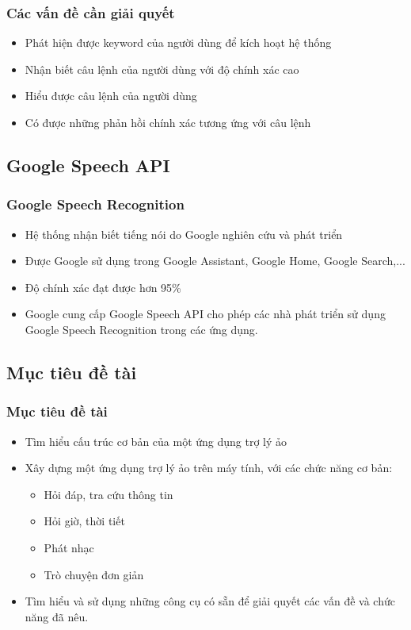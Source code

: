 \documentclass{beamer}
\begin{document}
\begin{frame}
\frametitle{Các vấn đề cần giải quyết}
\begin{itemize}
\item Phát hiện được keyword của người dùng để kích hoạt hệ thống
\item Nhận biết câu lệnh của người dùng với độ chính xác cao
\item Hiểu được câu lệnh của người dùng
\item Có được những phản hồi chính xác tương ứng với câu lệnh
\end{itemize}
\end{frame}

\subsection{Google Speech API}
\begin{frame}
\frametitle{Google Speech Recognition}
\begin{itemize}
\item Hệ thống nhận biết tiếng nói do Google nghiên cứu và phát triển
\item Được Google sử dụng trong Google Assistant, Google Home, Google Search,...
\item Độ chính xác đạt được hơn 95\%
\item Google cung cấp Google Speech API cho phép các nhà phát triển sử dụng Google Speech Recognition trong các ứng dụng.
\end{itemize}
\end{frame}

\subsection{Mục tiêu đề tài}

\begin{frame}
\frametitle{Mục tiêu đề tài}
\begin{itemize}
\item Tìm hiểu cấu trúc cơ bản của một ứng dụng trợ lý ảo
\item Xây dựng một ứng dụng trợ lý ảo trên máy tính, với các chức năng cơ bản:
    \begin{itemize}
    \item Hỏi đáp, tra cứu thông tin
    \item Hỏi giờ, thời tiết
    \item Phát nhạc
    \item Trò chuyện đơn giản
    \end{itemize}
\item Tìm hiểu và sử dụng những công cụ có sẵn để giải quyết các vấn đề và chức năng đã nêu.
\end{itemize}
\end{frame}
\end{document}
